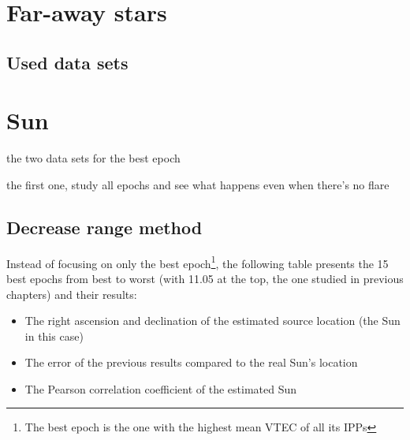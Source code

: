 \section{Far-away stars}

\subsection{Used data sets}








\clearpage
\clearpage

\section{Sun}

the two data sets for the best epoch

the first one, study all epochs and see what happens even when there's no flare

\subsection{Decrease range method}

Instead of focusing on only the best epoch\footnote{The best epoch is the one with the highest mean VTEC of all its IPPs}, the following table presents the 15 best epochs from best to worst (with 11.05 at the top, the one studied in previous chapters) and their results: 

\begin{itemize}
	\item The right ascension and declination of the estimated source location (the Sun in this case)
	\item The error of the previous results compared to the real Sun's location
	\item The Pearson correlation coefficient of the estimated Sun
\end{itemize}

